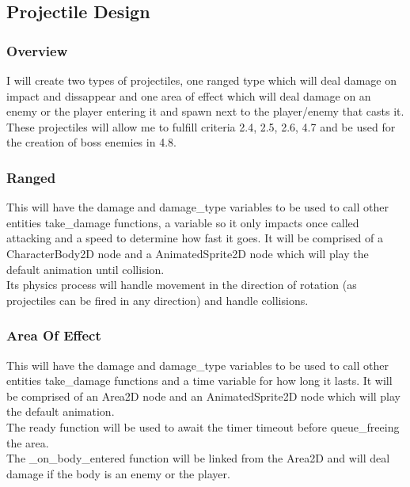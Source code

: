 \documentclass{article}
\begin{document}
        \subsection{Projectile Design}
        \subsubsection{Overview}
        I will create two types of projectiles, one ranged type which will deal damage on impact and dissappear and one area of effect which will deal damage on an enemy or the player entering it and spawn next to the player/enemy that casts it. These projectiles will allow me to fulfill criteria 2.4, 2.5, 2.6, 4.7 and be used for the creation of boss enemies in 4.8.\\
        \subsubsection{Ranged}
        This will have the damage and damage\_type variables to be used to call other entities take\_damage functions, a variable so it only impacts once called attacking and a speed to determine how fast it goes. It will be comprised of a CharacterBody2D node and a AnimatedSprite2D node which will play the default animation until collision.\\
        Its physics process will handle movement in the direction of rotation (as projectiles can be fired in any direction) and handle collisions.\\
        \subsubsection{Area Of Effect}
        This will have the damage and damage\_type variables to be used to call other entities take\_damage functions and a time variable for how long it lasts. It will be comprised of an Area2D node and an AnimatedSprite2D node which will play the default animation.\\
        The ready function will be used to await the timer timeout before queue\_freeing the area.\\
        The \_on\_body\_entered function will be linked from the Area2D and will deal damage if the body is an enemy or the player.\\
\end{document}
